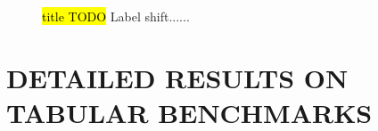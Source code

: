 \begin{figure}[htb]
    \centering
    \begin{subfigure}[b]{0.475\textwidth}
        \centering
        
    \end{subfigure}
    \hfill
    \begin{subfigure}[b]{0.475\textwidth}  
        \centering
        
    \end{subfigure}
    \begin{subfigure}[b]{0.475\textwidth}   
        \centering
        
    \end{subfigure}
    \hfill
    \begin{subfigure}[b]{0.475\textwidth}   
        \centering 
        
    \end{subfigure}
    \caption{
        \hl{title TODO} Label shift......
        } 
    \label{fig:ood-label-appendix}
\end{figure}










\clearpage
\section{DETAILED RESULTS ON TABULAR BENCHMARKS}

